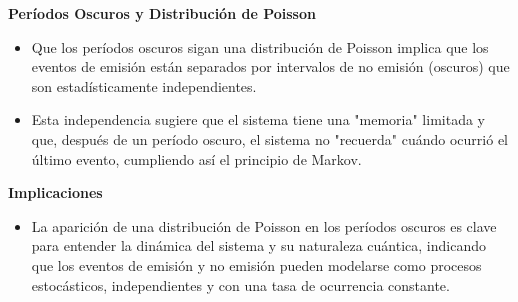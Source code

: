 \documentclass[11pt]{beamer}
\begin{document}
\begin{frame}
\textbf{Períodos Oscuros y Distribución de Poisson}

\begin{itemize}
    \item Que los períodos oscuros sigan una distribución de Poisson implica que los eventos de emisión están separados por intervalos de no emisión (oscuros) que son estadísticamente independientes.
    \item Esta independencia sugiere que el sistema tiene una "memoria" limitada y que, después de un período oscuro, el sistema no "recuerda" cuándo ocurrió el último evento, cumpliendo así el principio de Markov.
\end{itemize}

\end{frame}
\begin{frame}
\textbf{Implicaciones}

\begin{itemize}
    \item La aparición de una distribución de Poisson en los períodos oscuros es clave para entender la dinámica del sistema y su naturaleza cuántica, indicando que los eventos de emisión y no emisión pueden modelarse como procesos estocásticos, independientes y con una tasa de ocurrencia constante.
\end{itemize}

\end{frame}
\end{document}
